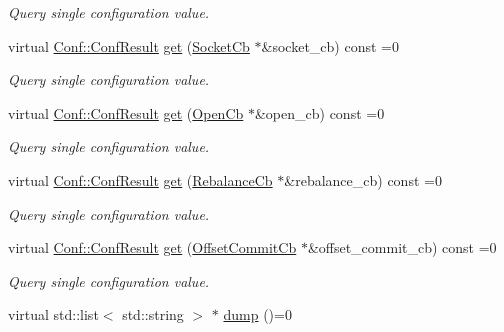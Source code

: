 \begin{DoxyCompactItemize}
\begin{DoxyCompactList}\small\item\em Query single configuration value. \item\end{DoxyCompactList}\item 
virtual \hyperlink{classRdKafka_1_1Conf_a1d023a689c09f42ab18b7bd1d15a11a6}{Conf::ConfResult} \hyperlink{classRdKafka_1_1Conf_a4cdab91c91fba1ee380bf90ff716ffee}{get} (\hyperlink{classRdKafka_1_1SocketCb}{SocketCb} $\ast$\&socket\_\-cb) const =0
\begin{DoxyCompactList}\small\item\em Query single configuration value. \item\end{DoxyCompactList}\item 
virtual \hyperlink{classRdKafka_1_1Conf_a1d023a689c09f42ab18b7bd1d15a11a6}{Conf::ConfResult} \hyperlink{classRdKafka_1_1Conf_a0c4d5be151ad4e1da74af1e5ad8071fc}{get} (\hyperlink{classRdKafka_1_1OpenCb}{OpenCb} $\ast$\&open\_\-cb) const =0
\begin{DoxyCompactList}\small\item\em Query single configuration value. \item\end{DoxyCompactList}\item 
virtual \hyperlink{classRdKafka_1_1Conf_a1d023a689c09f42ab18b7bd1d15a11a6}{Conf::ConfResult} \hyperlink{classRdKafka_1_1Conf_a72e44c96b9ce99bec94456edfbef3007}{get} (\hyperlink{classRdKafka_1_1RebalanceCb}{RebalanceCb} $\ast$\&rebalance\_\-cb) const =0
\begin{DoxyCompactList}\small\item\em Query single configuration value. \item\end{DoxyCompactList}\item 
virtual \hyperlink{classRdKafka_1_1Conf_a1d023a689c09f42ab18b7bd1d15a11a6}{Conf::ConfResult} \hyperlink{classRdKafka_1_1Conf_a7c7b6f5814360e4163cc1e6da53f585f}{get} (\hyperlink{classRdKafka_1_1OffsetCommitCb}{OffsetCommitCb} $\ast$\&offset\_\-commit\_\-cb) const =0
\begin{DoxyCompactList}\small\item\em Query single configuration value. \item\end{DoxyCompactList}\item 
\hypertarget{classRdKafka_1_1Conf_a873c2a3b90e05f99d68916f981096869}{
virtual std::list$<$ std::string $>$ $\ast$ \hyperlink{classRdKafka_1_1Conf_a873c2a3b90e05f99d68916f981096869}{dump} ()=0}
\label{classRdKafka_1_1Conf_a873c2a3b90e05f99d68916f981096869}


\end{DoxyCompactItemize}

